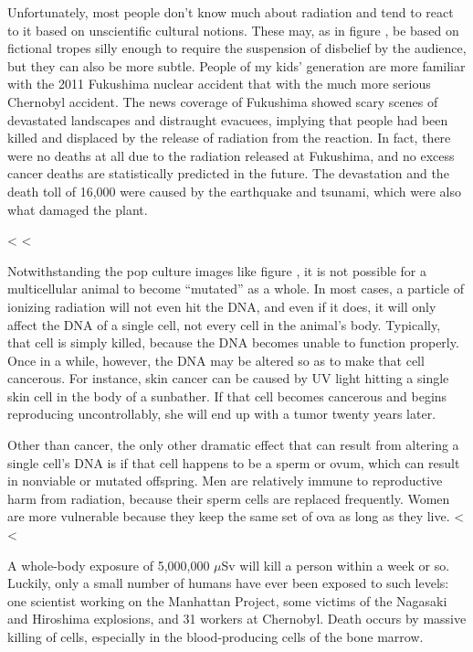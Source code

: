      Unfortunately, most people don't know much about radiation and tend to react to it based on 
      unscientific cultural notions. These may, as in figure , be based on
      fictional tropes silly enough to
      require the suspension of disbelief by the audience, but they can also be more subtle.
      People of my kids' generation are more familiar with the 2011 Fukushima nuclear accident
      that with the much more serious Chernobyl accident. The news coverage of Fukushima showed
      scary scenes of devastated landscapes and distraught evacuees, implying that people had been
      killed and displaced by the release of radiation from the reaction. In fact, there were no deaths
      at all due to the radiation released at Fukushima, and no excess cancer deaths are statistically
      predicted in the future. The devastation and the death toll of 16,000 were caused by the earthquake
      and tsunami, which were also what damaged the plant.

<%
<%

        Notwithstanding the pop culture images like figure , it is not possible for a multicellular
        animal to become ``mutated'' as a whole. In most cases, a
        particle of ionizing radiation will not even hit the DNA,
        and even if it does, it will only affect the DNA of a single
        cell, not every cell in the animal's body. Typically, that
        cell is simply killed, because the DNA becomes unable to
        function properly. Once in a while, however, the DNA may be
        altered so as to make that cell cancerous. For instance,
        skin cancer can be caused by UV light hitting a single skin
        cell in the body of a sunbather. If that cell becomes
        cancerous and begins reproducing uncontrollably, she will
        end up with a tumor twenty years later.

        Other than cancer, the only other dramatic effect that can
        result from altering a single cell's DNA is if that cell
        happens to be a sperm or ovum, which can result in nonviable
        or mutated offspring. Men are relatively immune to
        reproductive harm from radiation, because their sperm cells
        are replaced frequently. Women are more vulnerable because
        they keep the same set of ova as long as they live.
<%
<%

        A whole-body exposure of 5,000,000 $\mu$Sv 
        will kill a person
        within a week or so. Luckily, only a small number of humans
        have ever been exposed to such levels: one scientist working
        on the Manhattan  Project, some victims of the Nagasaki and
        Hiroshima explosions, and 31 workers at Chernobyl. Death
        occurs by massive killing of cells, especially in the
        blood-producing cells of the bone marrow.

